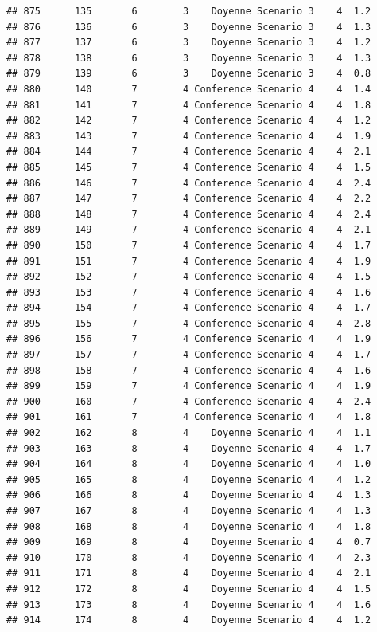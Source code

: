 \documentclass[
]{article}
\begin{document}
\begin{verbatim}
## 875      135       6        3    Doyenne Scenario 3    4  1.2
## 876      136       6        3    Doyenne Scenario 3    4  1.3
## 877      137       6        3    Doyenne Scenario 3    4  1.2
## 878      138       6        3    Doyenne Scenario 3    4  1.3
## 879      139       6        3    Doyenne Scenario 3    4  0.8
## 880      140       7        4 Conference Scenario 4    4  1.4
## 881      141       7        4 Conference Scenario 4    4  1.8
## 882      142       7        4 Conference Scenario 4    4  1.2
## 883      143       7        4 Conference Scenario 4    4  1.9
## 884      144       7        4 Conference Scenario 4    4  2.1
## 885      145       7        4 Conference Scenario 4    4  1.5
## 886      146       7        4 Conference Scenario 4    4  2.4
## 887      147       7        4 Conference Scenario 4    4  2.2
## 888      148       7        4 Conference Scenario 4    4  2.4
## 889      149       7        4 Conference Scenario 4    4  2.1
## 890      150       7        4 Conference Scenario 4    4  1.7
## 891      151       7        4 Conference Scenario 4    4  1.9
## 892      152       7        4 Conference Scenario 4    4  1.5
## 893      153       7        4 Conference Scenario 4    4  1.6
## 894      154       7        4 Conference Scenario 4    4  1.7
## 895      155       7        4 Conference Scenario 4    4  2.8
## 896      156       7        4 Conference Scenario 4    4  1.9
## 897      157       7        4 Conference Scenario 4    4  1.7
## 898      158       7        4 Conference Scenario 4    4  1.6
## 899      159       7        4 Conference Scenario 4    4  1.9
## 900      160       7        4 Conference Scenario 4    4  2.4
## 901      161       7        4 Conference Scenario 4    4  1.8
## 902      162       8        4    Doyenne Scenario 4    4  1.1
## 903      163       8        4    Doyenne Scenario 4    4  1.7
## 904      164       8        4    Doyenne Scenario 4    4  1.0
## 905      165       8        4    Doyenne Scenario 4    4  1.2
## 906      166       8        4    Doyenne Scenario 4    4  1.3
## 907      167       8        4    Doyenne Scenario 4    4  1.3
## 908      168       8        4    Doyenne Scenario 4    4  1.8
## 909      169       8        4    Doyenne Scenario 4    4  0.7
## 910      170       8        4    Doyenne Scenario 4    4  2.3
## 911      171       8        4    Doyenne Scenario 4    4  2.1
## 912      172       8        4    Doyenne Scenario 4    4  1.5
## 913      173       8        4    Doyenne Scenario 4    4  1.6
## 914      174       8        4    Doyenne Scenario 4    4  1.2

\end{verbatim}
\end{document}
